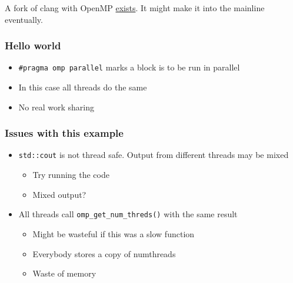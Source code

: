 A fork of clang with OpenMP \href{http://clang-omp.github.io/}{exists}.
It might make it into the mainline eventually.

\subsubsection{Hello world}\label{hello-world}

\begin{Shaded}
\begin{Highlighting}[]

   
\NormalTok{\{}
    \NormalTok{\{   }
         \NormalTok{;}
         \NormalTok{;}
         
            \NormalTok{<< } 
    \NormalTok{\}}
\NormalTok{\}}
\end{Highlighting}
\end{Shaded}

\begin{itemize}
\itemsep1pt\parskip0pt
\item
  \texttt{\#pragma omp parallel} marks a block is to be run in parallel
\item
  In this case all threads do the same
\item
  No real work sharing
\end{itemize}

\subsubsection{Issues with this example}\label{issues-with-this-example}

\begin{itemize}
\itemsep1pt\parskip0pt
\item
  \texttt{std::cout} is not thread safe. Output from different threads
  may be mixed

  \begin{itemize}
  \itemsep1pt\parskip0pt
  \item
    Try running the code
  \item
    Mixed output?
  \end{itemize}
\item
  All threads call \texttt{omp\_get\_num\_threds()} with the same result

  \begin{itemize}
  \itemsep1pt\parskip0pt
  \item
    Might be wasteful if this was a slow function
  \item
    Everybody stores a copy of numthreads
  \item
    Waste of memory
  \end{itemize}
\end{itemize}

